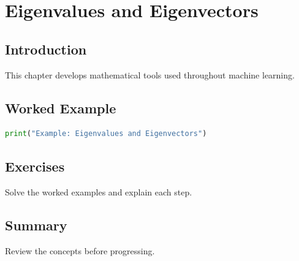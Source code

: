\chapter{Eigenvalues and Eigenvectors}
\label{chap:vol4-13}



\section{Introduction}
This chapter develops mathematical tools used throughout machine learning.

\section{Worked Example}
\begin{lstlisting}[language=Python]
print("Example: Eigenvalues and Eigenvectors")
\end{lstlisting}

\section{Exercises}
\begin{exercise}
Solve the worked examples and explain each step.
\end{exercise}

\section{Summary}
Review the concepts before progressing.

